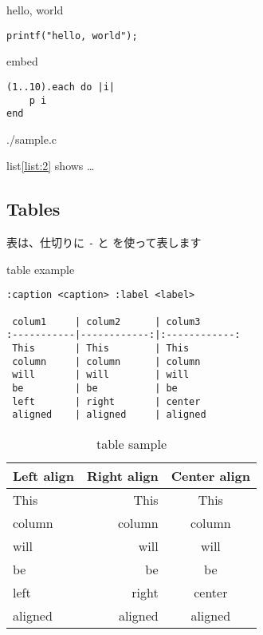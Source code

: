 \documentclass[a4j]{jarticle}
\begin{document}
\begin{itembox}[c]{hello, world}
\begin{verbatim}
printf("hello, world");
\end{verbatim}
\end{itembox}

\begin{itembox}[c]{embed}
{\small

}
\end{itembox}

\begin{lstlisting}[caption=iterate ,label=list:1]
(1..10).each do |i|
	p i
end
\end{lstlisting}


{./sample.c}

list\ref{list:2} shows \ldots{}

\subsection{Tables}

表は、仕切りに {\tt -} と {\tt \textbar{}} を使って表します

\begin{itembox}[c]{table example}
\begin{verbatim}
:caption <caption> :label <label>

 colum1     | colum2      | colum3
:-----------|------------:|:------------:
 This       | This        | This         
 column     | column      | column       
 will       | will        | will         
 be         | be          | be           
 left       | right       | center       
 aligned    | aligned     | aligned   
\end{verbatim}
\end{itembox}

\begin{table}[h]
\centering
\caption{table sample }
\label{table:1}
\begin{tabular}{|l|r|c|}
\hline
Left align & Right align & Center align\\
\hline
This & This & This\\
column & column & column\\
will & will & will\\
be & be & be\\
left & right & center\\
aligned & aligned & aligned\\
\hline
\end{tabular}
\end{table}
\end{document}
